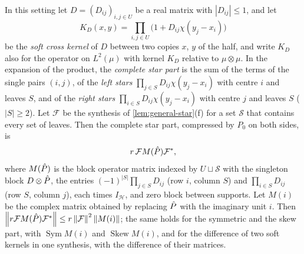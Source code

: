 \begin{corollary}\label{cor:star-matrix}
In this setting let $D=(D_{ij})_{i,j\in U}$ be a real matrix with $|D_{ij}|\le1$, and let
\[
  K_D(x,y)=\prod_{i,j\in U}\big(1+D_{ij}\chi(y_j-x_i)\big)
\]
be the \emph{soft cross kernel} of $D$ between two copies $x$, $y$
of the half, and write $K_D$ also for the operator on $L^2(\mu)$
with kernel $K_D$ relative to $\mu\otimes\mu$. In the expansion of the product, the \emph{complete star part} is the
sum of the terms of the single pairs $(i,j)$, of the \emph{left stars}
$\prod_{j\in S}D_{ij}\chi(y_j-x_i)$ with centre $i$ and leaves $S$, and of the
\emph{right stars} $\prod_{i\in S}D_{ij}\chi(y_j-x_i)$ with centre $j$ and leaves $S$
($|S|\ge2$). Let $\mathcal F$ be the synthesis of \cref{lem:general-star}(f) for a set
$\mathcal S$ that contains every set of leaves. Then the complete star part,
compressed by $P_0$ on both sides, is
\[
  r\,\mathcal F M(\hat P)\mathcal F^*,
\]
where $M(\hat P)$ is the block operator matrix indexed by $U\sqcup\mathcal S$ with the
singleton block $D\otimes\hat P$, the entries $(-1)^{|S|}\prod_{j\in S}D_{ij}$ (row $i$,
column $S$) and $\prod_{i\in S}D_{ij}$ (row $S$, column $j$), each times $I_{\mathcal H}$,
and zero block between supports. Let $M(i)$ be the complex matrix obtained by
replacing $\hat P$ with the imaginary unit $i$. Then
$\left\|r\mathcal FM(\hat P)\mathcal F^*\right\|\le r\left\|\mathcal F\right\|^2\left\|M(i)\right\|$; the same holds for the
symmetric and the skew part, with $\operatorname{Sym}M(i)$ and $\operatorname{Skew}M(i)$,
and for the difference of two soft kernels in one synthesis, with the difference of
their matrices.
\end{corollary}

